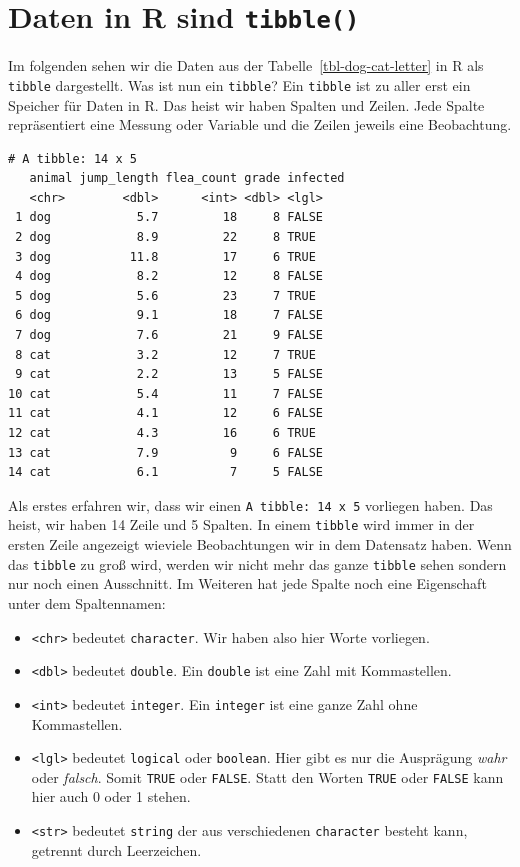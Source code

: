 \documentclass[
  letterpaper,
]{scrbook}
\providecommand{\tightlist}{%
  \setlength{\itemsep}{0pt}\setlength{\parskip}{0pt}}\usepackage{longtable,booktabs,array}
\begin{document}
\hypertarget{daten-in-r-sind-tibble}{%
\section{\texorpdfstring{Daten in R sind
\texttt{tibble()}}{Daten in R sind tibble()}}\label{daten-in-r-sind-tibble}}

Im folgenden sehen wir die Daten aus der
Tabelle~\ref{tbl-dog-cat-letter} in R als \texttt{tibble} dargestellt.
Was ist nun ein \texttt{tibble}? Ein \texttt{tibble} ist zu aller erst
ein Speicher für Daten in R. Das heist wir haben Spalten und Zeilen.
Jede Spalte repräsentiert eine Messung oder Variable und die Zeilen
jeweils eine Beobachtung.

\begin{verbatim}
# A tibble: 14 x 5
   animal jump_length flea_count grade infected
   <chr>        <dbl>      <int> <dbl> <lgl>   
 1 dog            5.7         18     8 FALSE   
 2 dog            8.9         22     8 TRUE    
 3 dog           11.8         17     6 TRUE    
 4 dog            8.2         12     8 FALSE   
 5 dog            5.6         23     7 TRUE    
 6 dog            9.1         18     7 FALSE   
 7 dog            7.6         21     9 FALSE   
 8 cat            3.2         12     7 TRUE    
 9 cat            2.2         13     5 FALSE   
10 cat            5.4         11     7 FALSE   
11 cat            4.1         12     6 FALSE   
12 cat            4.3         16     6 TRUE    
13 cat            7.9          9     6 FALSE   
14 cat            6.1          7     5 FALSE   
\end{verbatim}

Als erstes erfahren wir, dass wir einen \texttt{A\ tibble:\ 14\ x\ 5}
vorliegen haben. Das heist, wir haben 14 Zeile und 5 Spalten. In einem
\texttt{tibble} wird immer in der ersten Zeile angezeigt wieviele
Beobachtungen wir in dem Datensatz haben. Wenn das \texttt{tibble} zu
groß wird, werden wir nicht mehr das ganze \texttt{tibble} sehen sondern
nur noch einen Ausschnitt. Im Weiteren hat jede Spalte noch eine
Eigenschaft unter dem Spaltennamen:

\begin{itemize}
\tightlist
\item
  \texttt{\textless{}chr\textgreater{}} bedeutet \texttt{character}. Wir
  haben also hier Worte vorliegen.
\item
  \texttt{\textless{}dbl\textgreater{}} bedeutet \texttt{double}. Ein
  \texttt{double} ist eine Zahl mit Kommastellen.
\item
  \texttt{\textless{}int\textgreater{}} bedeutet \texttt{integer}. Ein
  \texttt{integer} ist eine ganze Zahl ohne Kommastellen.
\item
  \texttt{\textless{}lgl\textgreater{}} bedeutet \texttt{logical} oder
  \texttt{boolean}. Hier gibt es nur die Ausprägung \emph{wahr} oder
  \emph{falsch}. Somit \texttt{TRUE} oder \texttt{FALSE}. Statt den
  Worten \texttt{TRUE} oder \texttt{FALSE} kann hier auch 0 oder 1
  stehen.
\item
  \texttt{\textless{}str\textgreater{}} bedeutet \texttt{string} der aus
  verschiedenen \texttt{character} besteht kann, getrennt durch
  Leerzeichen.
\end{itemize}
\end{document}
